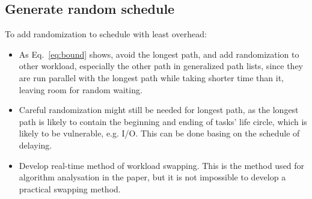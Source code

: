 \documentclass[./report.tex]{subfiles}
\begin{document}
\subsection{Generate random schedule}%

To add randomization to schedule with least overhead:
\begin{itemize}
   \item As Eq.~\ref{eq:bound} shows, avoid the longest path, and add randomization to other workload, especially the other path in generalized path lists, since they are run parallel with the longest path while taking shorter time than it, leaving room for random waiting.
   \item Careful randomization might still be needed for longest path, as the longest path is likely to contain the beginning and ending of tasks' life circle, which is likely to be vulnerable, e.g. I/O. This can be done basing on the schedule of delaying.
   \item Develop real-time method of workload swapping. This is the method used for algorithm analysation in the paper, but it is not impossible to develop a practical swapping method.
\end{itemize}
\end{document}
